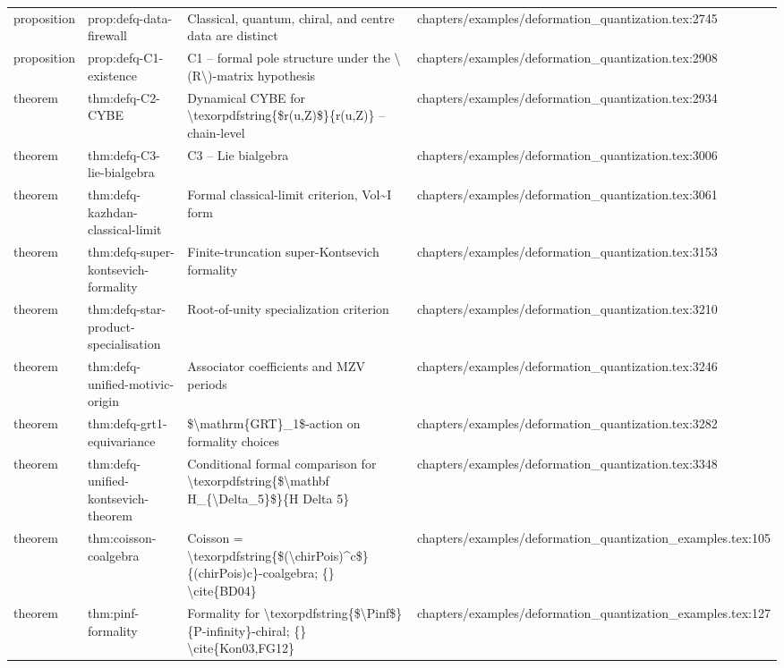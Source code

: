 \documentclass[11pt]{article}
\begin{document}
\begin{longtable}{L{0.10\textwidth}L{0.26\textwidth}L{0.42\textwidth}L{0.22\textwidth}}
proposition & prop:defq-data-firewall & Classical, quantum, chiral, and centre data are distinct & chapters/examples/deformation\_quantization.tex:2745\\
proposition & prop:defq-C1-existence & C1 -- formal pole structure under the \textbackslash{}(R\textbackslash{})-matrix hypothesis & chapters/examples/deformation\_quantization.tex:2908\\
theorem & thm:defq-C2-CYBE & Dynamical CYBE for \textbackslash{}texorpdfstring\{\$r(u,Z)\$\}\{r(u,Z)\} -- chain-level & chapters/examples/deformation\_quantization.tex:2934\\
theorem & thm:defq-C3-lie-bialgebra & C3 -- Lie bialgebra & chapters/examples/deformation\_quantization.tex:3006\\
theorem & thm:defq-kazhdan-classical-limit & Formal classical-limit criterion, Vol\textasciitilde{}I form & chapters/examples/deformation\_quantization.tex:3061\\
theorem & thm:defq-super-kontsevich-formality & Finite-truncation super-Kontsevich formality & chapters/examples/deformation\_quantization.tex:3153\\
theorem & thm:defq-star-product-specialisation & Root-of-unity specialization criterion & chapters/examples/deformation\_quantization.tex:3210\\
theorem & thm:defq-unified-motivic-origin & Associator coefficients and MZV periods & chapters/examples/deformation\_quantization.tex:3246\\
theorem & thm:defq-grt1-equivariance & \$\textbackslash{}mathrm\{GRT\}\_1\$-action on formality choices & chapters/examples/deformation\_quantization.tex:3282\\
theorem & thm:defq-unified-kontsevich-theorem & Cond{}itional formal comparison for \textbackslash{}texorpdfstring\{\$\textbackslash{}mathbf H\_\{\textbackslash{}Delta\_5\}\$\}\{H Delta 5\} & chapters/examples/deformation\_quantization.tex:3348\\
theorem & thm:coisson-coalgebra & Coisson = \textbackslash{}texorpdfstring\{\$(\textbackslash{}chirPois)\textasciicircum{}c\$\}\{(chirPois)c\}-coalgebra; \{\} \textbackslash{}cite\{BD04\} & chapters/examples/deformation\_quantization\_examples.tex:105\\
theorem & thm:pinf-formality & Formality for \textbackslash{}texorpdfstring\{\$\textbackslash{}Pinf\$\}\{P-infinity\}-chiral; \{\} \textbackslash{}cite\{Kon03,FG12\} & chapters/examples/deformation\_quantization\_examples.tex:127\\

\end{longtable}
\end{document}
